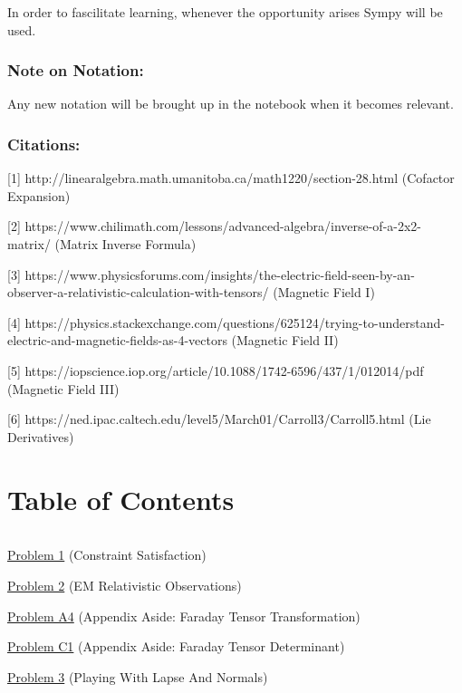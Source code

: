\documentclass[landscape,letterpaper,10pt,english]{article}
\begin{document}
In order to fascilitate learning, whenever the opportunity arises Sympy
will be used.

\hypertarget{note-on-notation}{%
\subsubsection{Note on Notation:}\label{note-on-notation}}

Any new notation will be brought up in the notebook when it becomes
relevant.

\hypertarget{citations}{%
\subsubsection{Citations:}\label{citations}}

{[}1{]} http://linearalgebra.math.umanitoba.ca/math1220/section-28.html
(Cofactor Expansion)

{[}2{]}
https://www.chilimath.com/lessons/advanced-algebra/inverse-of-a-2x2-matrix/
(Matrix Inverse Formula)

{[}3{]}
https://www.physicsforums.com/insights/the-electric-field-seen-by-an-observer-a-relativistic-calculation-with-tensors/
(Magnetic Field I)

{[}4{]}
https://physics.stackexchange.com/questions/625124/trying-to-understand-electric-and-magnetic-fields-as-4-vectors
(Magnetic Field II)

{[}5{]}
https://iopscience.iop.org/article/10.1088/1742-6596/437/1/012014/pdf
(Magnetic Field III)

{[}6{]}
https://ned.ipac.caltech.edu/level5/March01/Carroll3/Carroll5.html (Lie
Derivatives)

    \hypertarget{table-of-contents}{%
\section{Table of Contents}\label{table-of-contents}}

\[\label{toc}\]

\hyperref[p1]{Problem 1} (Constraint Satisfaction)

\hyperref[p2]{Problem 2} (EM Relativistic Observations)

\hyperref[a4]{Problem A4} (Appendix Aside: Faraday Tensor
Transformation)

\hyperref[c1]{Problem C1} (Appendix Aside: Faraday Tensor Determinant)

\hyperref[p3]{Problem 3} (Playing With Lapse And Normals)
\end{document}
